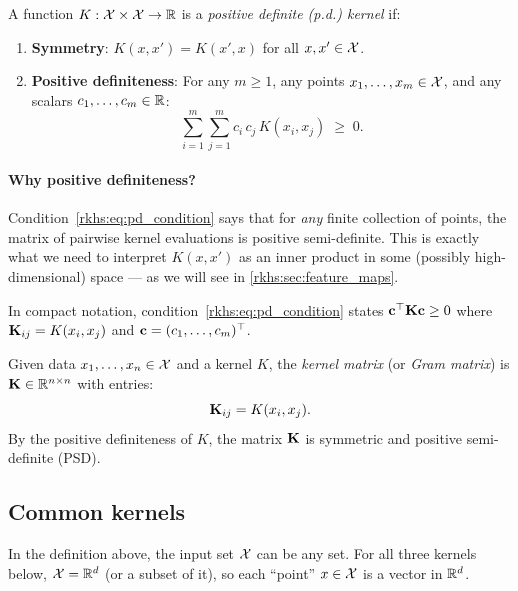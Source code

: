 \begin{notechapter}
\begin{definition}
\label{rkhs:def:pd_kernel}
A function $K: \mathcal{X} \times \mathcal{X} \to \mathbb{R}$ is a \emph{positive definite
(p.d.) kernel} if:
\begin{enumerate}[label=(\roman*)]
  \item \textbf{Symmetry}: $K(x, x') = K(x', x)$ for all $x, x' \in \mathcal{X}$.
  \item \textbf{Positive definiteness}: For any $m \geq 1$, any points
  $x_1, \ldots, x_m \in \mathcal{X}$, and any scalars $c_1, \ldots, c_m \in \mathbb{R}$:
  \begin{equation}
  \label{rkhs:eq:pd_condition}
  \sum_{i=1}^m \sum_{j=1}^m c_i\, c_j\, K(x_i, x_j) \;\geq\; 0.
  \end{equation}
\end{enumerate}
\end{definition}

\paragraph{Why positive definiteness?} Condition~\eqref{rkhs:eq:pd_condition}
says that for \emph{any} finite collection of points, the matrix of
pairwise kernel evaluations is positive semi-definite. This is exactly
what we need to interpret $K(x,x')$ as an inner product in some
(possibly high-dimensional) space --- as we will see in
\cref{rkhs:sec:feature_maps}.

In compact notation, condition~\eqref{rkhs:eq:pd_condition} states
$\mathbf{c}^\top \mathbf{K} \mathbf{c} \geq 0$ where $\mathbf{K}_{ij} = K(x_i, x_j)$
and $\mathbf{c} = (c_1, \ldots, c_m)^\top$.

\begin{definition}
\label{rkhs:def:gram_matrix}
Given data $x_1, \ldots, x_n \in \mathcal{X}$ and a kernel $K$, the
\emph{kernel matrix} (or \emph{Gram matrix}) is $\mathbf{K} \in \mathbb{R}^{n
\times n}$ with entries:
\[
\mathbf{K}_{ij} = K(x_i, x_j).
\]
By the positive definiteness of $K$, the matrix $\mathbf{K}$ is symmetric
and positive semi-definite (PSD).
\end{definition}

\subsection{Common kernels}
\label{rkhs:subsec:common_kernels}

In the definition above, the input set $\mathcal{X}$ can be any
set. For all three kernels below, $\mathcal{X} = \mathbb{R}^d$ (or a
subset of it), so each ``point'' $x \in \mathcal{X}$ is a
vector in $\mathbb{R}^d$.


\end{notechapter}
